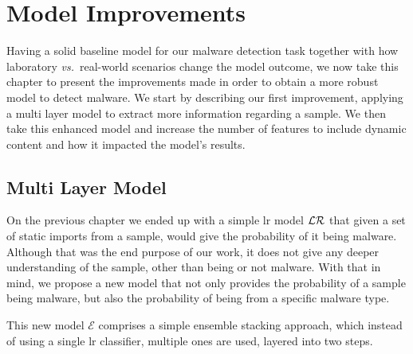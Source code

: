 
\chapter{Model Improvements}
\label{chapter:model_improvements}

Having a solid baseline model for our malware detection task together with how laboratory \textit{vs.}\ real-world scenarios change the model outcome, we now take this chapter to present the improvements made in order to obtain a more robust model to detect malware.
We start by describing our first improvement, applying a multi layer model to extract more information regarding a sample.
We then take this enhanced model and increase the number of features to include dynamic content and how it impacted the model's results.

\section{Multi Layer Model}
\label{section:improvements_multi_layer}

On the previous chapter we ended up with a simple \gls{lr} model $\mathcal{LR}$ that given a set of static imports from a sample, would give the probability of it being malware.
Although that was the end purpose of our work, it does not give any deeper understanding of the sample, other than being or not malware.
With that in mind, we propose a new model that not only provides the probability of a sample being malware, but also the probability of being from a specific malware type.

This new model $\mathcal{E}$ comprises a simple ensemble stacking approach, which instead of using a single \gls{lr} classifier, multiple ones are used, layered into two steps.


